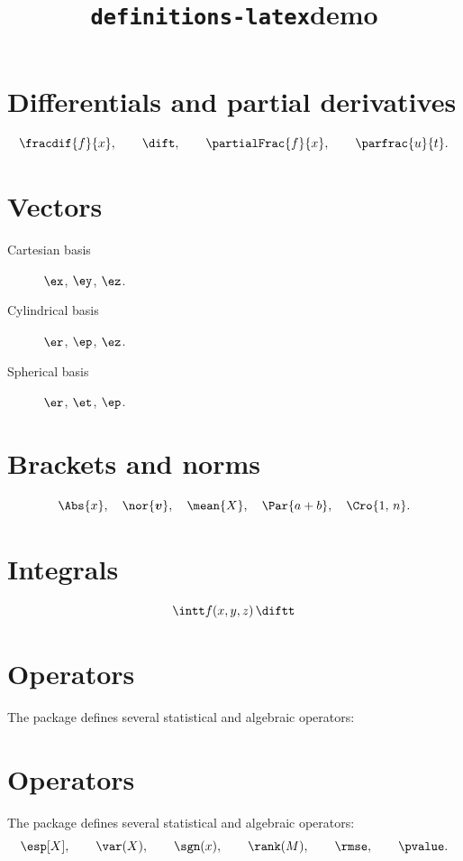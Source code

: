 \documentclass[11pt,a4paper]{article}
\title{\texttt{definitions-latex}\textemdash{}demo}
\author{}
\date{}
\begin{document}
\maketitle

\section{Differentials and partial derivatives}

\[
    \fracdif{f}{x}, \qquad
    \dift, \qquad
    \partialFrac{f}{x}, \qquad
    \parfrac{u}{t}.
\]

\section{Vectors}

\begin{description}
    \item[Cartesian basis] \(\ex \), \(\ey \), \(\ez \).
    \item[Cylindrical basis] \(\er \), \(\ep \), \(\ez \).
    \item[Spherical basis] \(\er \), \(\et \), \(\ep \).
\end{description}

\section{Brackets and norms}

\[
    \Abs{x}, \quad
    \nor{\bm{v}}, \quad
    \mean{X}, \quad
    \Par{a + b}, \quad
    \Cro{1,\, n}.
\]

\section{Integrals}

\[
    \intt f(x,y,z)\, \diftt
\]

\section{Operators}

The package defines several statistical and algebraic operators:
\section{Operators}
The package defines several statistical and algebraic operators:
\[
    \esp[X], \qquad
    \var(X), \qquad
    \sgn(x), \qquad
    \rank(M), \qquad
    \rmse, \qquad
    \pvalue.
\]
\end{document}

